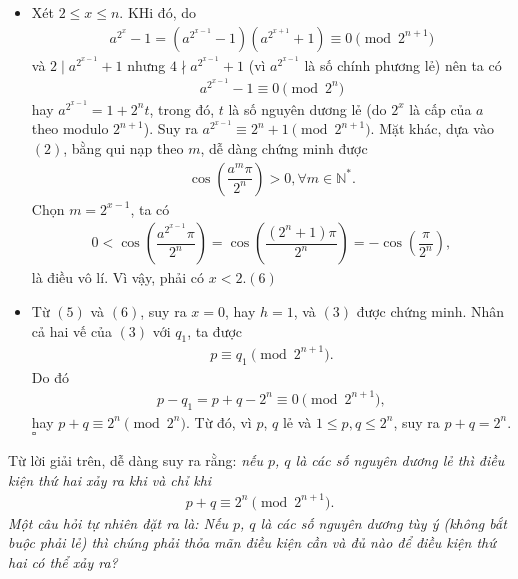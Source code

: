 \begin{bt}
{\begin{itemize}
			\item Xét $2\le x\le n$. KHi đó, do 
			\begin{align*}
			a^{2^x}-1=\left( a^{2^{x-1}}-1 \right)\left( a^{2^{x+1}}+1 \right)\equiv 0 \pmod{2^{n+1}}
			\end{align*} 
			và $2\mid a^{2^{x-1}}+1$ nhưng $4 \nmid a^{2^{x-1}}+1$ (vì $a^{2^{x-1}}$ là số chính phương lẻ) nên ta có
			\begin{align*}
			a^{2^{x-1}}-1\equiv 0 \pmod{2^n}
			\end{align*}
			hay $a^{2^{x-1}} =1+2^nt$, trong đó, $t$ là số nguyên dương lẻ (do $2^x$ là cấp của $a$ theo modulo $2^{n+1}$). Suy ra $a^{2^{x-1}}\equiv 2^n+1 \pmod{2^{n+1}}$. Mặt khác, dựa vào $(2)$, bằng qui nạp theo $m$, dễ dàng chứng minh được
			\begin{align*}
			\cos\left( \dfrac{a^m\pi}{2^n} \right)>0, \forall m\in \mathbb{N}^*.
			\end{align*}
			Chọn $m=2^{x-1}$, ta có
			\begin{align*}
			0< \cos \left( \dfrac{a^{2^{x-1}}\pi}{2^n} \right)=\cos \left( \dfrac{\left( 2^n+1 \right)\pi}{2^n} \right)=-\cos \left( \dfrac{\pi}{2^n} \right),
			\end{align*}
			là điều vô lí. Vì vậy, phải có $x<2$.\hfill $(6)$
			
			\item Từ $(5)$ và $(6)$, suy ra $x=0$, hay $h=1$, và $(3)$ được chứng minh. Nhân cả hai vế của $(3)$ với $q_1$, ta được
			\begin{align*}
			p\equiv q_1 \pmod{2^{n+1}}.
			\end{align*}
			Do đó
			\begin{align*}
			p-q_1=p+q-2^n \equiv 0 \pmod{2^{n+1}},
			\end{align*}
			hay $p+q\equiv 2^n \pmod{2^n}$. Từ đó, vì $p$, $q$ lẻ và $1\le p,q\le 2^n$, suy ra $p+q=2^n$.\hfill $\square$
		\end{itemize}
		
		\begin{nx}
			Từ lời giải trên, dễ dàng suy ra rằng: \textit{nếu $p$, $q$ là các số nguyên dương lẻ thì điều kiện thứ hai xảy ra khi và chỉ khi
				\begin{align*}
				p+q\equiv 2^n\pmod{2^{n+1}}.
				\end{align*}
				Một câu hỏi tự nhiên đặt ra là: \textit{Nếu $p$, $q$ là các số nguyên dương tùy ý (không bắt buộc phải lẻ) thì chúng phải thỏa mãn điều kiện cần và đủ nào để điều kiện thứ hai có thể xảy ra?}
			}
		\end{nx}
	}
\end{bt}
